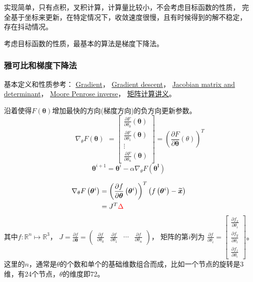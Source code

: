 \documentclass[lang=cn,newtx,10pt,scheme=chinese]{elegantbook}
\begin{document}
实现简单，只有点积，叉积计算，计算量比较小，不会考虑目标函数的性质，
完全基于坐标来更新，在特定情况下，收敛速度很慢，且有时候得到的解不稳定，
存在抖动情况。

考虑目标函数的性质，最基本的算法是梯度下降法。

\subsubsection{雅可比和梯度下降法}
基本定义和性质参考：
\href{https://en.wikipedia.org/wiki/Gradient}{Gradient}，
\href{https://en.wikipedia.org/wiki/Gradient_descent}{Gradient descent}，
\href{https://en.wikipedia.org/wiki/Jacobian_matrix_and_determinant}{Jacobian matrix and determinant}，
\href{https://en.wikipedia.org/wiki/Moore%E2%80%93Penrose_inverse}{Moore Penrose inverse}，
\href{https://math.ecnu.edu.cn/~jypan/Teaching/MatrixComp/mc.pdf}{矩阵计算讲义}。

沿着使得$F(\boldsymbol{\theta})$增加最快的方向(梯度方向)的负方向更新参数。
\begin{equation}
  \begin{aligned}
  & \qquad \nabla_\theta F(\boldsymbol{\theta})
  \end{aligned}=\left[\begin{array}{c}
  \frac{\partial F}{\partial \theta_0}(\boldsymbol{\theta}) \\
  \frac{\partial F}{\partial \theta_1}(\boldsymbol{\theta}) \\
  \vdots \\
  \frac{\partial F}{\partial \theta_n}(\boldsymbol{\theta})
  \end{array}\right]=\left(\frac{\partial F}{\partial \boldsymbol{\theta}}(\theta)\right)^T
\end{equation}
$$\boldsymbol{\theta}^{i+1} = \boldsymbol{\theta}^{i} - \alpha \nabla_\theta F(\boldsymbol{\theta^{l}})$$

\begin{equation}
  \begin{aligned}
  \nabla_\theta F\left(\boldsymbol{\theta}^i\right) & =\left(\frac{\partial f}{\partial \boldsymbol{\theta}}\left(\boldsymbol{\theta}^i\right)\right)^T\left(f\left(\boldsymbol{\theta}^i\right)-\widetilde{\boldsymbol{x}}\right) \\
  & =J^T\color{red}{\Delta}
  \end{aligned}
\end{equation}
其中$f: \mathbb{R}^n \mapsto \mathbb{R}^3$，
$J=\frac{\partial f}{\partial \boldsymbol{\theta}}=
\left(\begin{array}{llll}\frac{\partial f}{\partial \theta_0} 
  & \frac{\partial f}{\partial \theta_1} & \cdots & 
  \frac{\partial f}{\partial \theta_n}\end{array}\right)$，
矩阵的第$i$列为
$\frac{\partial f}{\partial \theta_i} = 
\left[\begin{array}{c}
  \frac{\partial f_x}{\partial \theta_i} \\
  \frac{\partial f_y}{\partial \theta_i} \\
  \frac{\partial f_z}{\partial \theta_i}
\end{array}\right]$。
这里的$n$，通常是$\theta$的个数和单个的基础维数组合而成，比如一个节点的旋转是3维，有24个节点，$\theta$的维度即72。
\end{document}

